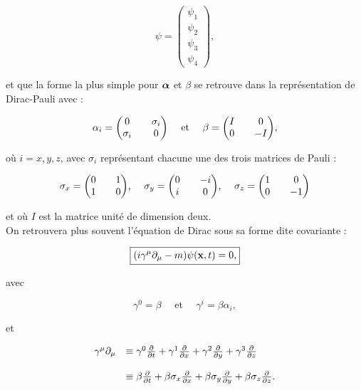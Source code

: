         \[
            \psi = 
            \begin{pmatrix}
                \psi_1 \\
                \psi_2 \\
                \psi_3 \\
                \psi_4
            \end{pmatrix}
        ,\]
        
        et que la forme la plus simple pour $\vb*{\alpha}$ et $\beta$ se retrouve dans la représentation de Dirac-Pauli avec :
        
        \[
            \alpha_i = 
            \mqty(0 && \sigma_i \\ \sigma_i && 0)
            \quad
            \mbox{ et }
            \quad
            \beta = 
            \mqty(I && 0 \\ 0 && -I)
        ,\]
        
        où $i=x,y,z$, avec $\sigma_i$ représentant chacune une des trois matrices de Pauli :
        
        \[
            \sigma_x = 
            \mqty(0 && 1 \\ 1 && 0)
            \mbox{, }
            \quad
            \sigma_y = 
            \mqty(0 && -i \\ i && 0)
            \mbox{, }
            \quad
            \sigma_z = 
            \mqty(1 && 0 \\ 0 && -1)
        \]
        
        et où $I$ est la matrice unité de dimension deux. \\
        
        On retrouvera plus souvent l'équation de Dirac sous sa forme dite covariante :
        
        \begin{equation}
        \boxed{
            (i\gamma^{\mu}\partial_{\mu}-m)\psi(\vb{x},t)=0,
        }
        \label{dirac2}
        \end{equation}
        
        avec

        \[
            \gamma^0 = 
            \beta
            \quad
            \mbox{ et }
            \quad
            \gamma^i = 
            \beta\alpha_i
        ,\]

        et
        
        $$
        \begin{array}{ll}
            \gamma^{\mu}\partial_{\mu} & \equiv\gamma^0\pdv{t}+\gamma^1\pdv{x}+\gamma^2\pdv{y}+\gamma^3\pdv{z} \\
            & \\
            & \equiv\beta\pdv{t}+\beta\sigma_x\pdv{x}+\beta\sigma_y\pdv{y}+\beta\sigma_z\pdv{z}.
        \end{array}
        $$

